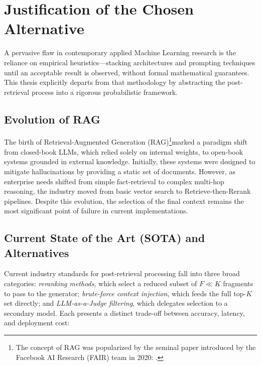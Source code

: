 \section{Justification of the Chosen Alternative}
\label{sec:justification}

A pervasive flaw in contemporary applied Machine Learning research is the reliance on empirical heuristics—stacking architectures and prompting techniques until an acceptable result is observed, without formal mathematical guarantees. This thesis explicitly departs from that methodology by abstracting the post-retrieval process into a rigorous probabilistic framework.

\subsection{Evolution of RAG}
\label{subsec:evolution-rag}
The birth of Retrieval-Augmented Generation (RAG)\footnote{The concept of RAG was popularized by the seminal paper introduced by the Facebook AI Research (FAIR) team in 2020: \cite{FAISRAG2020}.}marked a paradigm shift from closed-book LLMs, which relied solely on internal weights, to open-book systems grounded in external knowledge. Initially, these systems were designed to mitigate hallucinations by providing a static set of documents. However, as enterprise needs shifted from simple fact-retrieval to complex multi-hop reasoning, the industry moved from basic vector search to Retrieve-then-Rerank pipelines. Despite this evolution, the selection of the final context remains the most significant point of failure in current implementations.

\subsection{Current State of the Art (SOTA) and Alternatives}
\label{subsec:sota-alternatives}
Current industry standards for post-retrieval processing fall into three broad categories: \emph{reranking methods}, which select a reduced subset of $F \ll K$ fragments to pass to the generator; \emph{brute-force context injection}, which feeds the full top-$K$ set directly; and \emph{LLM-as-a-Judge filtering}, which delegates selection to a secondary model. Each presents a distinct trade-off between accuracy, latency, and deployment cost:

